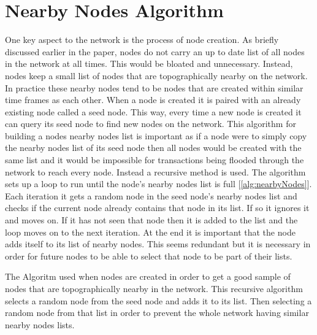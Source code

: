 \documentclass{l4proj}
\begin{document}
\section{Nearby Nodes Algorithm}
One key aspect to the network is the process of node creation. As briefly discussed earlier in the paper, nodes
do not carry an up to date list of all nodes in the network at all times. This would be bloated and unnecessary.
Instead, nodes keep a small list of nodes that are topographically nearby on the network. In practice these nearby
nodes tend to be nodes that are created within similar time frames as each other. When a node is created it is
paired with an already existing node called a seed node. This way, every time a new node is created it can query
its seed node to find new nodes on the network. This algorithm for building a nodes nearby nodes list is important
as if a node were to simply copy the nearby nodes list of its seed node then all nodes would be created with the
same list and it would be impossible for transactions being flooded through the network to reach every node. Instead
a recursive method is used. The algorithm sets up a loop to run until the node's nearby nodes list is full
[\ref{alg:nearbyNodes}]. Each iteration it gets a random node in the seed node's nearby nodes list and checks if 
the current node already contains that node in its list. If so it ignores it and moves on. If it has not seen 
that node then it is added to the list and the loop moves on to the next iteration. At the end it is important 
that the node adds itself to its list of nearby nodes. This seems redundant but it is necessary in order for 
future nodes to be able to select that node to be part of their lists.

\begin{algorithm}
    \DontPrintSemicolon
    
\caption{
    The Algoritm used when nodes are created in order to get a good sample of nodes that are topographically nearby
    in the network. This recursive algorithm selects a random node from the seed node and adds it to its list. Then
    selecting a random node from that list in order to prevent the whole network having similar nearby nodes lists.
}
\label{alg:nearbyNodes}
\end{algorithm}
\end{document}
